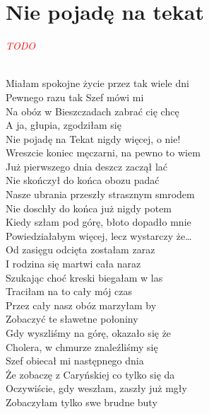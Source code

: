 \documentclass[a5paper, 10pt]{book}
\begin{document}
\newpage
\section{Nie pojadę na tekat}\textcolor{red}{\textit{TODO}}\\~\\
\begin{minipage}[t]{0.8\textwidth}

Miałam spokojne życie przez tak wiele dni	\\
Pewnego razu tak Szef mówi mi	\\
Na obóz w Bieszczadach zabrać cię chcę 	\\
A ja, głupia, zgodziłam się	\\

\hspace*{5mm}Nie pojadę na Tekat nigdy więcej, o nie!		\\
\hspace*{5mm}Wreszcie koniec męczarni, na pewno to wiem	\\

Już pierwszego dnia deszcz zaczął lać 		\\
Nie skończył do końca obozu padać\\
Nasze ubrania przeszły strasznym smrodem 	\\
Nie doschły do końca już nigdy potem\\

\hspace*{5mm}Kiedy szłam pod górę, błoto dopadło mnie 	\\
\hspace*{5mm}Powiedziałabym więcej, lecz wystarczy że…\\

Od zasięgu odcięta zostałam zaraz 		\\
I rodzina się martwi cała naraz	\\
Szukając choć kreski biegałam w las 		\\
Traciłam na to cały mój czas	\\

Przez cały nasz obóz marzyłam by		\\
Zobaczyć te sławetne połoniny	\\
Gdy wyszliśmy na górę, okazało się że		\\
Cholera, w chmurze znaleźliśmy się\\

Szef obiecał mi następnego dnia		\\
Że zobaczę z Caryńskiej co tylko się da\\
Oczywiście, gdy weszłam, zaszły już mgły 	\\
Zobaczyłam tylko swe brudne buty\\


\end{minipage}
\end{document}

